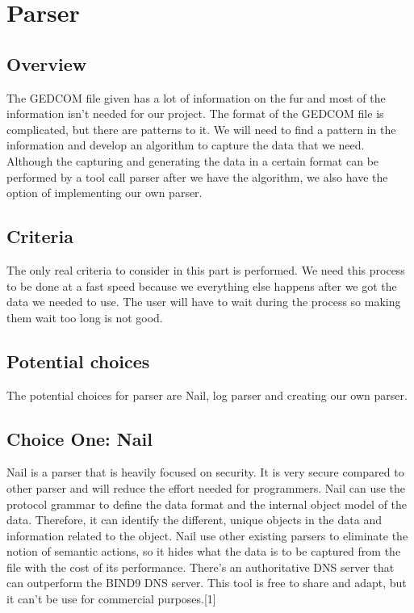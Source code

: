 \documentclass[onecolumn, draftclsnofoot, 10pt, compsoc]{IEEEtran}
\begin{document}
\section{Parser}
\subsection{Overview}
\begin{singlespace}
The GEDCOM file given has a lot of information on the fur and most of the information isn't needed for our project. The format of the GEDCOM file is complicated, but there are patterns to it. We will need to find a pattern in the information and develop an algorithm to capture the data that we need. Although the capturing and generating the data in a certain format can be performed by a tool call parser after we have the algorithm, we also have the option of implementing our own parser.
\end{singlespace}

\subsection{Criteria}
\begin{singlespace}
The only real criteria to consider in this part is performed. We need this process to be done at a fast speed because we everything else happens after we got the data we needed to use. The user will have to wait during the process so making them wait too long is not good.
\end{singlespace}

\subsection{Potential choices}
\begin{singlespace}
The potential choices for parser are Nail, log parser and creating our own parser.
\end{singlespace}


\subsection{Choice One: Nail}
\begin{singlespace}
Nail is a parser that is heavily focused on security. It is very secure compared to other parser and will reduce the effort needed for programmers. Nail can use the protocol grammar to define the data format and the internal object model of the data. Therefore, it can identify the different, unique objects in the data and information related to the object. Nail use other existing parsers to eliminate the notion of semantic actions, so it hides what the data is to be captured from the file with the cost of its performance. There's an authoritative DNS server that can outperform the BIND9 DNS server. This tool is free to share and adapt, but it can't be use for commercial purposes.[1] 
\end{singlespace}
\end{document}
